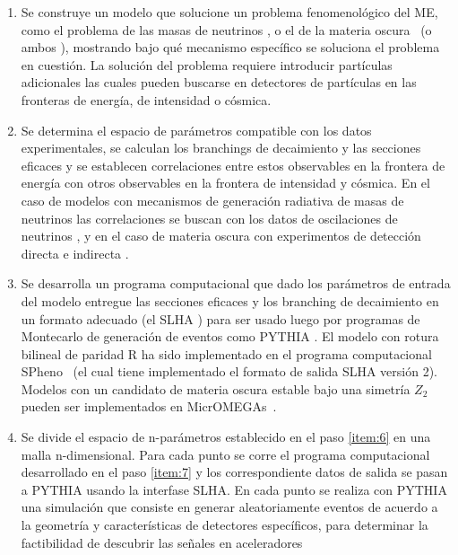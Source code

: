 \begin{enumerate}
\item Se construye un modelo que solucione un problema fenomenológico
  del ME, como el problema de las masas de neutrinos
  \cite{Hirsch:2000ef}, o el de la materia oscura~\cite{Bernal:2009tt,Bernal:2009jc} (o ambos
  \cite{Hirsch:2005ag,Restrepo:2011rj}), mostrando bajo qué mecanismo
  específico se soluciona el problema en cuestión. La solución del
  problema requiere introducir partículas adicionales las cuales
  pueden buscarse en detectores de partículas en las fronteras de
  energía, de intensidad o cósmica.
  \label{item:5}
\item Se determina el espacio de parámetros compatible con los datos
  experimentales, se calculan los branchings de decaimiento y las
  secciones eficaces y se establecen correlaciones entre estos
  observables en la frontera de energía con otros observables en la
  frontera de intensidad y cósmica. En el caso de modelos con
  mecanismos de generación radiativa de masas de neutrinos las
  correlaciones se buscan con los datos de oscilaciones de neutrinos
  \cite{Diaz:2003as}, y en el caso de materia oscura con experimentos
  de detección directa e indirecta \cite{Bernal:2009tt,Bernal:2009jc,Choi:2010xn,Restrepo:2011rj}.
  \label{item:6}
\item Se desarrolla un programa computacional que dado los parámetros
  de entrada del modelo entregue las secciones eficaces y los
  branching de decaimiento en un formato adecuado (el SLHA
  \cite{Allanach:2008qq}) para ser usado luego por programas de Montecarlo
  de generación de eventos como PYTHIA \cite{Sjostrand:2006za}. El
  modelo con rotura bilineal de paridad R ha sido implementado en el
  programa computacional SPheno~\cite{Porod:2003um} (el cual tiene
  implementado el formato de salida SLHA versión 2). Modelos con un
  candidato de materia oscura estable bajo una simetría $Z_2$ pueden
  ser implementados en MicrOMEGAs~\cite{Belanger:2006is,Belanger:2008sj,Belanger:2010gh}.
  \label{item:7}
\item Se divide el espacio de n-parámetros establecido en el paso
  \ref{item:6} en una malla n-dimensional. Para cada punto se corre el
  programa computacional desarrollado en el paso \ref{item:7} y los
  correspondiente datos de salida se pasan a PYTHIA usando la
  interfase SLHA. En cada punto se realiza con PYTHIA una simulación
  que consiste en generar aleatoriamente eventos de acuerdo a la
  geometría y características de detectores específicos, para
  determinar la factibilidad de descubrir las señales en aceleradores

\end{enumerate}

